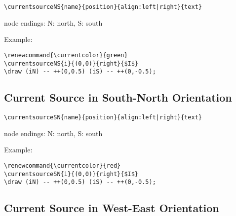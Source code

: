 \documentclass[parskip=full]{scrartcl}
\begin{document}
\begin{verbatim}
\currentsourceNS{name}{position}{align:left|right}{text}
\end{verbatim}
node endings: N: north, S: south

Example:\\
\begin{minipage}{0.8\textwidth}
\begin{verbatim}
\renewcommand{\currentcolor}{green}
\currentsourceNS{i}{(0,0)}{right}{$I$}
\draw (iN) -- ++(0,0.5) (iS) -- ++(0,-0.5);
\end{verbatim}
\end{minipage}
\begin{minipage}{0.19\textwidth}
\end{minipage}

\subsection{Current Source in South-North Orientation}

\begin{verbatim}
\currentsourceSN{name}{position}{align:left|right}{text}
\end{verbatim}
node endings: N: north, S: south

Example:\\
\begin{minipage}{0.8\textwidth}
\begin{verbatim}
\renewcommand{\currentcolor}{red}
\currentsourceSN{i}{(0,0)}{right}{$I$}
\draw (iN) -- ++(0,0.5) (iS) -- ++(0,-0.5);
\end{verbatim}
\end{minipage}
\begin{minipage}{0.19\textwidth}
\end{minipage}

\subsection{Current Source in West-East Orientation}
\end{document}
